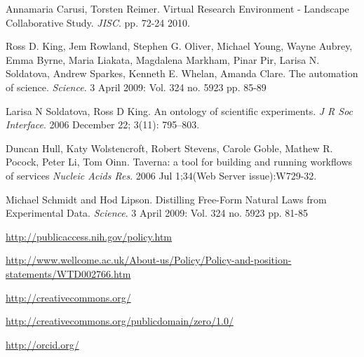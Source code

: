 \documentclass{article}
\begin{document}
\begin{thebibliography}{9}

 Annamaria Carusi, Torsten Reimer. Virtual Research
  Environment - Landscape Collaborative Study. {\em JISC}. pp. 72-24
  2010.

 Ross D. King, Jem Rowland, Stephen G. Oliver, Michael
  Young, Wayne Aubrey, Emma Byrne, Maria Liakata, Magdalena Markham,
  Pinar Pir, Larisa N. Soldatova, Andrew Sparkes, Kenneth E. Whelan,
  Amanda Clare. The automation of science. {\em Science}. 3 April 2009:
  Vol. 324 no. 5923 pp. 85-89

 Larisa N Soldatova, Ross D King. An ontology of
  scientific experiments. {\em J R Soc Interface}. 2006 December 22;
  3(11): 795–803.

 Duncan Hull, Katy Wolstencroft, Robert Stevens, Carole
  Goble, Mathew R. Pocock, Peter Li, Tom Oinn.  Taverna: a tool for
  building and running workflows of services {\em Nucleic Acids
    Res}. 2006 Jul 1;34(Web Server issue):W729-32.

 Michael Schmidt and Hod Lipson. Distilling Free-Form
  Natural Laws from Experimental Data. {\em Science}. 3 April 2009:
  Vol. 324 no. 5923 pp. 81-85

 \url{http://publicaccess.nih.gov/policy.htm}

  \url{http://www.wellcome.ac.uk/About-us/Policy/Policy-and-position-statements/WTD002766.htm}

 \url{http://creativecommons.org/}

 \url{http://creativecommons.org/publicdomain/zero/1.0/}

 \url{http://orcid.org/}

\end{thebibliography}
\end{document}
